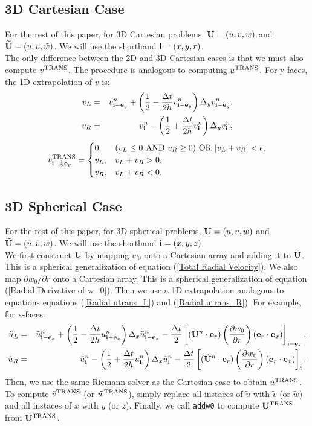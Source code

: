 \documentclass[11pt]{article}
\def\half  {\frac{1}{2}}
\def\dt    {\Delta t}
\def\trans {\rm TRANS}
\def\eb    {{\bf e}}
\def\ib    {{\bf i}}
\def\Ub    {{\bf U}}
\def\Ubt   {\widetilde{\bf U}}
\def\ut    {\tilde{u}}
\def\vt    {\tilde{v}}
\def\wt    {\tilde{w}}
\begin{document}
\subsection{3D Cartesian Case}
For the rest of this paper, for 3D Cartesian problems, $\Ub = (u,v,w)$ and $\Ubt = (u,v,\wt)$.  We will use the shorthand $\ib = (x,y,r)$.\\

The only difference between the 2D and 3D Cartesian cases is that we must also compute $v^{\trans}$.  The procedure is analogous to computing $u^{\trans}$.  For y-faces, the 1D extrapolation of $v$ is:
\begin{eqnarray}
v_L &=& v_{\ib-\eb_y}^n + \left(\half - \frac{\dt}{2h}v_{\ib-\eb_y}^n\right)\Delta_y v_{\ib-\eb_y}^n, \\
v_R &=& v_{\ib}^n - \left(\half + \frac{\dt}{2h}v_{\ib}^n\right)\Delta_y v_{\ib}^n,
\end{eqnarray}
\begin{equation}
v^{\trans}_{\ib-\half\eb_y} =
\begin{cases}
0, & (v_L \le 0 ~ {\rm AND} ~ v_R \ge 0) ~ {\rm OR} ~ |v_L + v_R| < \epsilon, \\
v_L, & v_L + v_R > 0, \\
v_R, & v_L + v_R < 0. \\
\end{cases}
\end{equation}
\subsection{3D Spherical Case}
For the rest of this paper, for 3D spherical problems, $\Ub = (u,v,w)$ and $\Ubt = (\ut,\vt,\wt)$.  We will use the shorthand $\ib = (x,y,z)$.\\

We first construct $\Ub$ by mapping $w_0$ onto a Cartesian array and adding it to $\Ubt$.  This is a spherical generalization of equation (\ref{Total Radial Velocity}).  We also map $\partial w_0/\partial r$ onto a Cartesian array.  This is a spherical generalization of equation (\ref{Radial Derivative of w_0}).  Then we use a 1D extrapolation analogous to equations equations (\ref{Radial utrans_L}) and (\ref{Radial utrans_R}).  For example, for x-faces:
\begin{eqnarray}
\ut_L &=& \ut_{\ib-\eb_x}^n + \left(\half - \frac{\dt}{2h}u_{\ib-\eb_x}^n\right)\Delta_x\ut_{\ib-\eb_x}^n - \frac{\dt}{2}\left[(\Ubt^n\cdot\eb_r)\left(\frac{\partial w_0}{\partial r}\right)(\eb_r\cdot\eb_x)\right]_{\ib-\eb_x}, \\
\ut_R &=& \ut_{\ib}^n - \left(\half + \frac{\dt}{2h}u_{\ib}^n\right)\Delta_x\ut_{\ib}^n - \frac{\dt}{2}\left[(\Ubt^n\cdot\eb_r)\left(\frac{\partial w_0}{\partial r}\right)(\eb_r\cdot\eb_x)\right]_{\ib}.
\end{eqnarray}
Then, we use the same Riemann solver as the Cartesian case to obtain $\ut^{\trans}$.  To compute $\vt^{\trans}$ (or $\wt^{\trans}$), simply replace all instaces of $\ut$ with $\vt$ (or $\wt$) and all instaces of $x$ with $y$ (or $z$).  Finally, we call {\tt addw0} to compute $\Ub^{\trans}$ from $\Ubt^{\trans}$.
\end{document}
